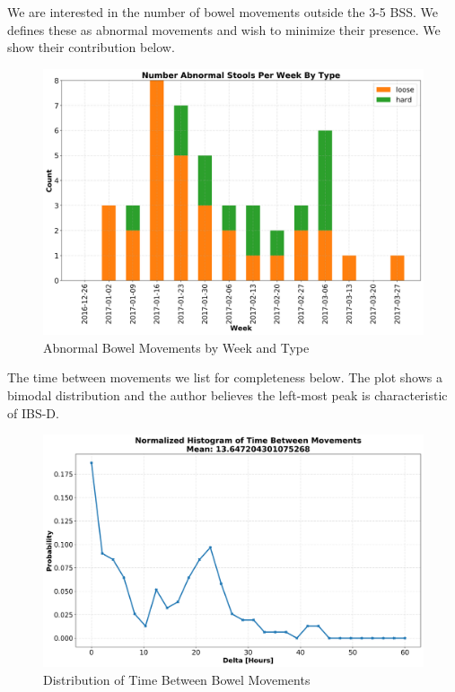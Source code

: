 \documentclass[conference]{IEEEtran}
\begin{document}
We are interested in the number of bowel movements outside the 3-5 BSS. We defines these as abnormal movements and wish to minimize their presence.  We show their contribution below.

\begin{figure}[t]
    \centering
    \includegraphics[width=\columnwidth]{abnormal.png}
    \caption{Abnormal Bowel Movements by Week and Type}\label{fig:bss_abnormal}
\end{figure}

The time between movements we list for completeness below.  The plot shows a bimodal distribution and the author believes the left-most peak is characteristic of IBS-D.

\begin{figure}[t]
    \centering
    \includegraphics[width=\columnwidth]{time_between_movements.png}
    \caption{Distribution of Time Between Bowel Movements}\label{fig:time_between_movements}
\end{figure}
\end{document}
